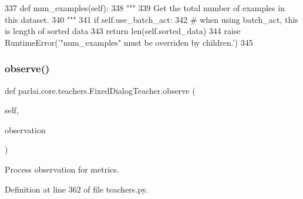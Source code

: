 \begin{DoxyCode}
337     \textcolor{keyword}{def }num\_examples(self):
338         \textcolor{stringliteral}{"""}
339 \textcolor{stringliteral}{        Get the total number of examples in this dataset.}
340 \textcolor{stringliteral}{        """}
341         \textcolor{keywordflow}{if} self.use\_batch\_act:
342             \textcolor{comment}{# when using batch\_act, this is length of sorted data}
343             \textcolor{keywordflow}{return} len(self.sorted\_data)
344         \textcolor{keywordflow}{raise} RuntimeError(\textcolor{stringliteral}{'"num\_examples" must be overriden by children.'})
345 
\end{DoxyCode}
\mbox{\label{classparlai_1_1core_1_1teachers_1_1FixedDialogTeacher_a32febe29909f7523b0d7b5ee7335fd05}} 
\subsubsection{\texorpdfstring{observe()}{observe()}}
{\footnotesize\ttfamily def parlai.\+core.\+teachers.\+Fixed\+Dialog\+Teacher.\+observe (\begin{DoxyParamCaption}\item[{}]{self,  }\item[{}]{observation }\end{DoxyParamCaption})}

\begin{DoxyVerb}Process observation for metrics.
\end{DoxyVerb}
 

Definition at line 362 of file teachers.\+py.


